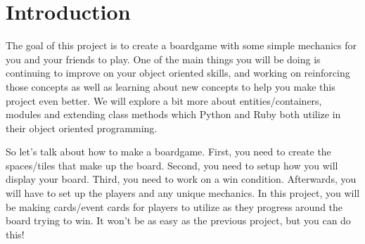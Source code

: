 \documentclass{42-en}
\begin{document}

\chapter{Introduction}

	The goal of this project is to create a boardgame with some simple mechanics
	for you and your friends to play. One of the main things you will be doing is
	continuing to improve on your object oriented skills, and working on reinforcing
	those concepts as well as learning about new concepts to help you make this
	project even better. We will explore a bit more about entities/containers,
	modules and extending class methods which Python and Ruby both utilize
	in their object oriented programming.\\


	So let's talk about how to make a boardgame. First, you need to create the
	spaces/tiles that make up the board. Second, you need to setup how you will
	display your board. Third, you need to work on a win condition. Afterwards,
	you will have to set up the players and any unique mechanics. In this project,
	you will be making cards/event cards for players to utilize as they progress
	around the board trying to win. It won't be as easy as the previous project,
	but you can do this!\\


\end{document}
